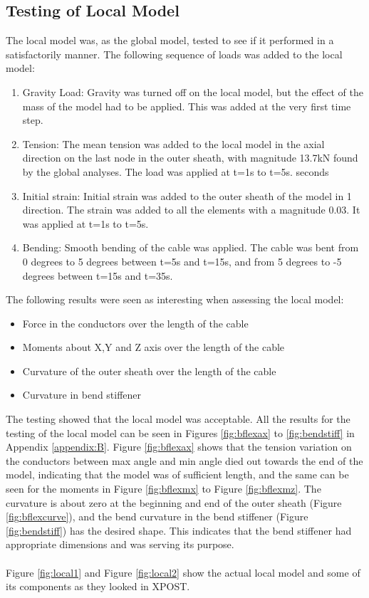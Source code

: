 \subsection{Testing of Local Model}
\label{sec:localtest}
The local model was, as the global model, tested to see if it performed in a satisfactorily manner.
 \noindent The following sequence of loads was added to the local model:
\begin{enumerate}
    \item Gravity Load: Gravity was turned off on the local model, but the effect of the mass of the model had to be applied. This was added at the very first time step.
    \item Tension: The mean tension was added to the local model in the axial direction on the last node in the outer sheath, with magnitude 13.7kN found by the global analyses. The load was applied at t=1s to t=5s. seconds
    \item Initial strain: Initial strain was added to the outer sheath of the model in 1 direction. The strain was added to all the elements with a magnitude 0.03. It was applied at t=1s to t=5s.
    \item Bending: Smooth bending of the cable was applied. The cable was bent from 0 degrees to 5 degrees between t=5s and t=15s, and from 5 degrees to -5 degrees between t=15s and t=35s.  
\end{enumerate}
The following results were seen as interesting when assessing the local model:
\begin{itemize}
    \item Force in the conductors over the length of the cable
    \item Moments about X,Y and Z axis over the length of the cable
    \item Curvature of the outer sheath over the length of the cable
    \item Curvature in bend stiffener
\end{itemize}
The testing showed that the local model was acceptable. All the results for the testing of the local model can be seen in Figures \ref{fig:bflexax} to \ref{fig:bendstiff} in Appendix \ref{appendix:B}. Figure \ref{fig:bflexax} shows that the tension variation on the conductors between max angle and min angle died out towards the end of the model, indicating that the model was of sufficient length, and the same can be seen for the moments in Figure \ref{fig:bflexmx} to Figure \ref{fig:bflexmz}. The curvature is about zero at the beginning and end of the outer sheath (Figure \ref{fig:bflexcurve}), and the bend curvature in the bend stiffener (Figure \ref{fig:bendstiff}) has the desired shape. This indicates that the bend stiffener had appropriate dimensions and was serving its purpose. \\\\
Figure \ref{fig:local1} and Figure \ref{fig:local2} show the actual local model and some of its components as they looked in XPOST.

